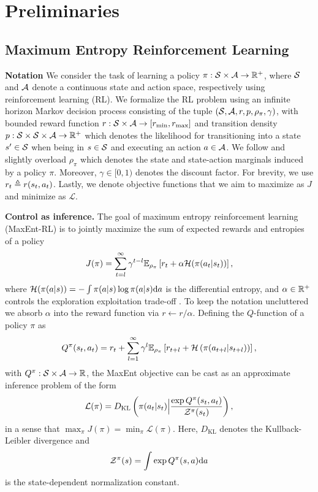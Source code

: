 \section{Preliminaries}
\subsection{Maximum Entropy Reinforcement Learning}
\label{sec: Maximum Entropy Reinforcement Learning}
\textbf{Notation} We consider the task of learning a policy $\pi: \mathcal{S} \times \mathcal{A} \rightarrow \mathbb{R}^+$,
where $\mathcal{S}$ and $\mathcal{A}$ denote a continuous state and action space, respectively using reinforcement learning (RL). We formalize the RL problem using an infinite horizon Markov decision process consisting of the tuple $(\mathcal{S},\mathcal{A},r,p,\rho_{\pi}, \gamma)$, with bounded reward function $r: \mathcal{S} \times \mathcal{A} \rightarrow [r_{\text{min}}, r_{\text{max}}]$ and transition density $p: \mathcal{S} \times \mathcal{S} \times \mathcal{A} \rightarrow \mathbb{R}^+$ which denotes the likelihood for transitioning into a state $s' \in \mathcal{S}$ when being in $s \in \mathcal{S}$ and executing an action $a \in \mathcal{A}$. We follow \cite{haarnoja2018soft} and slightly overload $\rho_{\pi}$ which denotes the state and state-action marginals induced by a policy $\pi$. Moreover, $\gamma \in [0, 1)$ denotes the discount factor.
For brevity, we use $r_t\triangleq r(s_t,a_t)$. Lastly, we denote objective functions that we aim to maximize as $J$ and minimize as $\mathcal{L}$.

\textbf{Control as inference.} The goal of maximum entropy reinforcement learning (MaxEnt-RL) is to jointly maximize the sum of expected rewards and entropies of a policy
\begin{equation}
\label{eq: marginal max ent}
    J(\pi) = \sum_{t=l}^{\infty} \gamma^{t-l}\mathbb{E}_{\rho_\pi}\left[r_t + \alpha \mathcal{H}(\pi(a_t|s_t))\right],
\end{equation}
where $\mathcal{H}(\pi(a|s)) = - \int \pi(a|s) \log \pi(a|s) \mathrm{d} a$ is the differential entropy, and $\alpha \in \mathbb{R}^+$ controls the exploration exploitation trade-off \cite{haarnoja2017reinforcement}. To keep the notation uncluttered we absorb $ \alpha$ into the reward function via $r \leftarrow r/\alpha$. Defining the $Q$-function of a policy $\pi$ as
\begin{equation}
\label{eq: marginal Q soft}
Q^{\pi}(s_t,a_t) = r_t + \sum_{l=1}^\infty\gamma^{l} \mathbb{E}_{\rho_{\pi}}\left[r_{t+l}+ \mathcal{H}\left(\pi(a_{t+l}|s_{t+l})\right)\right],
\end{equation}
with $Q^{\pi}: \mathcal{S} \times \mathcal{A} \rightarrow \mathbb{R}$,
the MaxEnt objective can be cast as an approximate inference problem of the form
\begin{equation}
\label{eq: marginal control as inference}
\mathcal{L}(\pi) = D_{\text{KL}}\left(\pi(a_t|s_t)\Big|\frac{\exp Q^{\pi}(s_t,a_t)}{\mathcal{Z}^{\pi}(s_t)}\right),
\end{equation}
in a sense that 
$
    \max_{\pi} J(\pi) = \min_{\pi} \mathcal{L}(\pi).
$
Here, $D_{\text{KL}}$ denotes the Kullback-Leibler divergence and 
\begin{equation}
\label{eq: normalizer}
\mathcal{Z}^{\pi}(s) = \int \exp Q^{\pi}(s,a) \mathrm{d} a
\end{equation}
is the state-dependent normalization constant.

